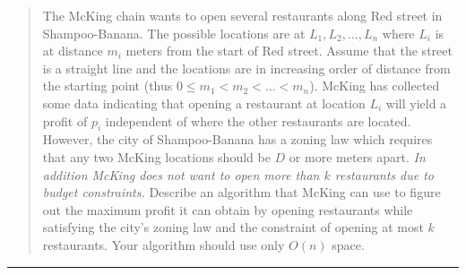 \documentclass[11pt]{article}
\begin{document}



\begin{quote}
	The McKing chain wants to open several restaurants along Red
  street in Shampoo-Banana. The possible locations are at $L_1,L_2,
  \ldots, L_n$ where $L_i$ is at distance $m_i$ meters from the start
  of Red street. Assume that the street is a straight line and the
  locations are in increasing order of distance from the starting
  point (thus $0 \leq m_1 < m_2 < \ldots < m_n$). McKing has collected
  some data indicating that opening a restaurant at location $L_i$
  will yield a profit of $p_i$ independent of where the other
  restaurants are located. However, the city of Shampoo-Banana has a
  zoning law which requires that any two McKing locations should be
  $D$ or more meters apart. {\em In addition McKing does not want to
    open more than $k$ restaurants due to budget constraints.}
  Describe an algorithm that McKing can use to figure out the maximum
  profit it can obtain by opening restaurants while satisfying the
  city's zoning law and the constraint of opening at most $k$
  restaurants.  Your algorithm should use only $O(n)$ space.
\end{quote}
\hrule
\end{document}
